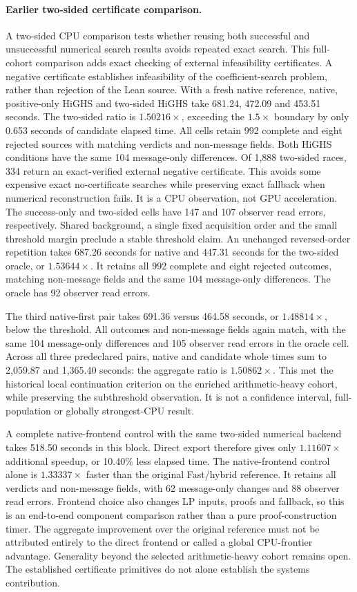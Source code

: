 \documentclass[10pt,twocolumn]{article}
\begin{document}
\paragraph{Earlier two-sided certificate comparison.}
A two-sided CPU comparison tests whether reusing both successful and unsuccessful numerical search results avoids repeated exact search. This full-cohort comparison adds exact checking of external
infeasibility certificates. A negative certificate establishes infeasibility of
the coefficient-search problem, rather than rejection of the Lean source. With a fresh native reference, native,
positive-only HiGHS and two-sided HiGHS take 681.24, 472.09 and
453.51 seconds. The two-sided ratio is $1.50216\times$, exceeding
the $1.5\times$ boundary by only 0.653 seconds of candidate elapsed time.
All cells retain 992 complete and eight rejected sources with matching
verdicts and non-message fields. Both HiGHS conditions have the same
104 message-only differences. Of 1,888 two-sided races, 334 return an
exact-verified external negative certificate. This avoids some expensive
exact no-certificate searches while preserving exact fallback when numerical
reconstruction fails. It is a CPU observation, not GPU acceleration.
The success-only and two-sided cells have 147 and 107 observer read errors,
respectively. Shared background, a single fixed acquisition order and the
small threshold margin preclude a stable threshold claim. An unchanged
reversed-order repetition takes 687.26 seconds for native and 447.31 seconds
for the two-sided oracle, or $1.53644\times$. It retains all 992 complete
and eight rejected outcomes, matching non-message fields and the same
104 message-only differences. The oracle has 92 observer read errors.

The third native-first pair takes 691.36 versus 464.58 seconds,
or $1.48814\times$, below the threshold. All outcomes and non-message fields
again match, with the same 104 message-only differences and 105 observer
read errors in the oracle cell. Across all three predeclared pairs,
native and candidate whole times sum to 2,059.87 and 1,365.40 seconds:
the aggregate ratio is $1.50862\times$. This met the historical local continuation
criterion on the enriched arithmetic-heavy cohort, while preserving the
subthreshold observation. It is not a confidence interval, full-population
or globally strongest-CPU result.

A complete native-frontend control with the same two-sided numerical
backend takes 518.50 seconds in this block. Direct export therefore gives
only $1.11607\times$ additional speedup, or 10.40\% less elapsed time.
The native-frontend control alone is $1.33337\times$ faster than the original
Fast/hybrid reference. It retains all verdicts and non-message fields,
with 62 message-only changes and 88 observer read errors. Frontend choice
also changes LP inputs, proofs and fallback, so this is an end-to-end
component comparison rather than a pure proof-construction timer.
The aggregate improvement over the original reference must not be
attributed entirely to the direct frontend or called a global CPU-frontier
advantage. Generality beyond the selected arithmetic-heavy cohort remains open. The established certificate
primitives do not alone establish the systems contribution.
\end{document}
